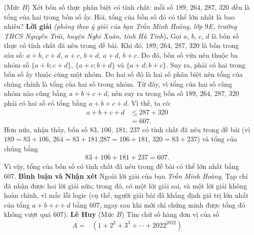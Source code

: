 \begin{multicols}{2}
	\setlength{\abovedisplayskip}{4pt}
	\setlength{\belowdisplayskip}{4pt}
	{}
	(Mức $B$) Xét bốn số thực phân biệt có tính chất: mỗi số $189$, $264$, $287$, $320$ đều là tổng của hai trong bốn số ấy. Hỏi, tổng của bốn số đó có thể lớn nhất là bao nhiêu?
	\vskip 0.05cm
	\textbf{\color{thachthuctoanhoc}Lời giải} \textit{(phỏng theo ý giải của bạn Trần Minh Hoàng, lớp $9$E, trường THCS Nguyễn Trãi, huyện Nghi Xuân, tỉnh Hà Tĩnh})\textbf{\color{thachthuctoanhoc}.}
	\vskip 0.05cm
	Gọi $a$, $b$, $c$, $d$ là bốn số thực có tính chất đã nêu trong đề bài.
	\vskip 0.05cm
	Khi đó, $189$, $264$, $287$, $320$ là bốn trong sáu số: $a + b$, $c + d$, $a + c$, $b + d$, $a + d$, $b + c$. Do đó, bốn số vừa nêu thuộc ba nhóm số $\{a \!+\! b; c \!+\! d\}$, $\{a \!+\! c; b \!+\! d\}$ và $\{a \!+\! d; b \!+\! c\}$. Suy ra, phải có hai trong bốn số ấy thuộc cùng một nhóm. Do hai số đó là hai số phân biệt nên tổng của chúng chính là tổng của hai số trong nhóm. Từ đây, vì tổng của hai số cùng nhóm nào cũng bằng $a + b + c + d$, nên suy ra trong bốn số $189$, $264$, $287$, $320$ phải có hai số có tổng bằng $a + b + c + d$. Vì thế, ta có:
	\begin{align*}
		a + b + c + d &\le 287 + 320\\
		 &= 607.
	\end{align*}
	Hơn nữa, nhận thấy, bốn số $83$, $106$, $181$, $237$ có tính chất đã nêu trong đề bài (vì $189 = 83 + 106$, $264 = 83 + 181$,\linebreak $287 = 106 + 181$, $320 = 83 + 237$) và tổng của chúng bằng
	\begin{align*}
		83 + 106 + 181 + 237 = 607.
	\end{align*}
	Vì vậy, tổng của bốn số có tính chất đã nêu trong đề bài có thể lớn nhất bằng $607$.
	\vskip 0.05cm
	\textbf{\color{thachthuctoanhoc}Bình luận và Nhận xét}
	\vskip 0.05cm
	Ngoài lời giải của bạn \textit{Trần Minh Hoàng}, Tạp chí đã nhận được hai lời giải nữa; trong đó, có một lời giải sai, và một lời giải không hoàn chỉnh, vì mắc lỗi logic (cụ thể, người giải bài đã khẳng định giá trị lớn nhất của tổng $a + b + c + d$ bằng $607$, ngay sau khi mới chỉ chứng minh được tổng đó không vượt quá $607$).
	\vskip 0.05cm
	\hfill	\textbf{\color{thachthuctoanhoc}Lê Huy}
	\vskip 0.05cm
	{}
	(Mức $B$) Tìm chữ số hàng đơn vị của số 
	\begin{align*}
		A=&\left(1+2^2+3^3+\cdots+2022^{2022}\right)\\

\end{align*}
\end{multicols}
